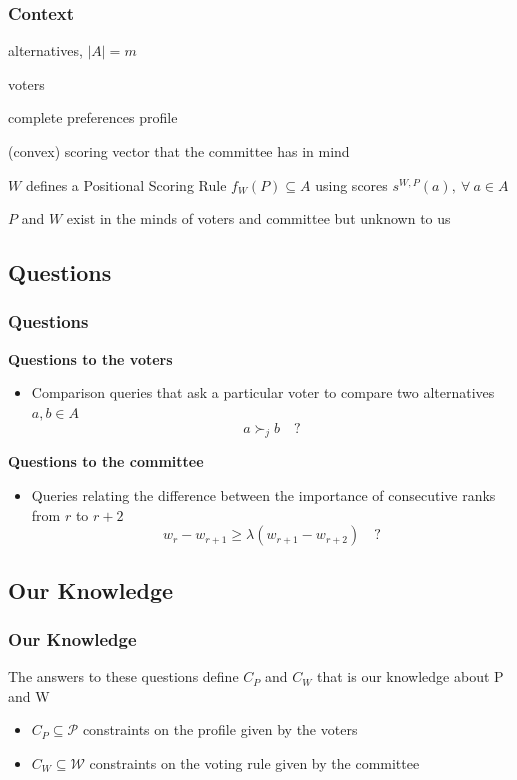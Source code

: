 \documentclass{beamer}
\newcommand{\w}{\bm{w}}
\newcommand{\pref}{\succ}%
\begin{document}
\begin{frame}
	\frametitle{Context}

		\begin{description}[$W=(\w_k,\ 1\leq k \leq m), \ W \in \mathcal{W}$]
			\item [$A$] alternatives, $|A|=m$
			\item [$N$] voters 
			\item [$P = (\pref_j, \ j \in N ), \ P \in \mathcal{P} $] complete preferences profile 
			\item [$W=(\w_r,\ 1\leq r \leq m), \ W \in \mathcal{W}$] (convex) scoring vector that the committee has in mind
		\end{description}
		\bigskip
		 \begin{block}{}
			$W$ defines a Positional Scoring Rule $f_W(P)\subseteq A$ using scores \color{blue}$s^{W,P}(a), \ \forall \ a \in A$
		\end{block}
		 \begin{block}{}
			$P$ and $W$ exist in the minds of voters and committee but unknown to us
		\end{block}
		
\end{frame}

\subsection{Questions}
\begin{frame}
	\frametitle{Questions}
	 \textbf{Questions to the voters}
	\begin{itemize}
		\item[] Comparison queries that ask a particular voter to compare two alternatives $a, b \in A$
		\color{blue}\[a \pref_j b \quad ?\]
	\end{itemize}
	  \textbf{Questions to the committee}
	\begin{itemize}
		\item[] Queries relating the difference between the importance of consecutive ranks from $r$ to $r+2$
		\color{blue} \[ w_{r} - w_{r+1} \geq \lambda (w_{r+1} - w_{r+2}) \quad ? \] 
	\end{itemize}
\end{frame}

\subsection{Our Knowledge}
\begin{frame}
	\frametitle{Our Knowledge}
	The answers to these questions define $C_P$ and $C_W$ that is our knowledge about P and W 
	\medskip
	\begin{itemize}
		 \item $C_P \subseteq \mathcal{P}$ constraints on the profile given by the voters
		\onslide<3-> \item $C_W \subseteq \mathcal{W}$ constraints on the voting rule given by the committee
	\end{itemize}
\end{frame}
\end{document}
